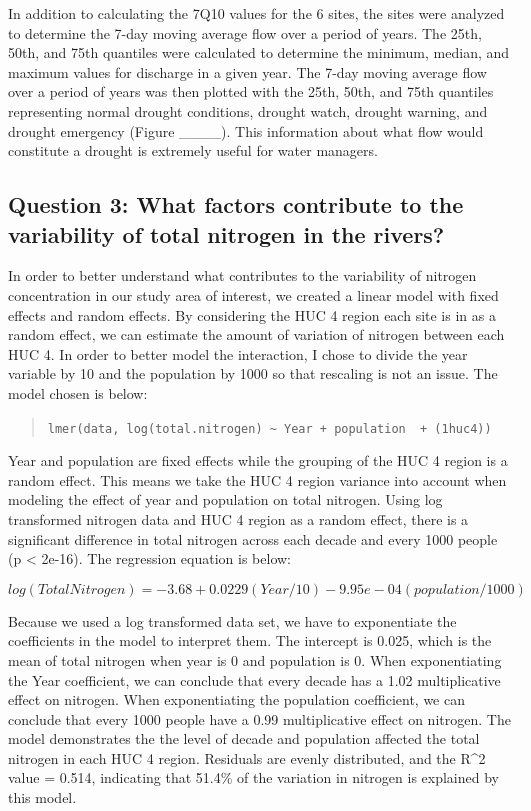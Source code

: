 \documentclass[12pt,]{article}
\begin{document}
In addition to calculating the 7Q10 values for the 6 sites, the sites
were analyzed to determine the 7-day moving average flow over a period
of years. The 25th, 50th, and 75th quantiles were calculated to
determine the minimum, median, and maximum values for discharge in a
given year. The 7-day moving average flow over a period of years was
then plotted with the 25th, 50th, and 75th quantiles representing normal
drought conditions, drought watch, drought warning, and drought
emergency (Figure \_\_\_\_). This information about what flow would
constitute a drought is extremely useful for water managers.

\hypertarget{question-3-what-factors-contribute-to-the-variability-of-total-nitrogen-in-the-rivers}{%
\subsection{Question 3: What factors contribute to the variability of
total nitrogen in the
rivers?}\label{question-3-what-factors-contribute-to-the-variability-of-total-nitrogen-in-the-rivers}}

In order to better understand what contributes to the variability of
nitrogen concentration in our study area of interest, we created a
linear model with fixed effects and random effects. By considering the
HUC 4 region each site is in as a random effect, we can estimate the
amount of variation of nitrogen between each HUC 4. In order to better
model the interaction, I chose to divide the year variable by 10 and the
population by 1000 so that rescaling is not an issue. The model chosen
is below:

\begin{quote}
\texttt{lmer(data,\ log(total.nitrogen)\ \textasciitilde{}\ Year\ +\ population\ \ +\ (1\textbar{}huc4))}
\end{quote}

Year and population are fixed effects while the grouping of the HUC 4
region is a random effect. This means we take the HUC 4 region variance
into account when modeling the effect of year and population on total
nitrogen. Using log transformed nitrogen data and HUC 4 region as a
random effect, there is a significant difference in total nitrogen
across each decade and every 1000 people (p \textless{} 2e-16). The
regression equation is below:

\[log(Total Nitrogen) = -3.68 + 0.0229(Year/10) - 9.95e-04(population/1000)\]

Because we used a log transformed data set, we have to exponentiate the
coefficients in the model to interpret them. The intercept is 0.025,
which is the mean of total nitrogen when year is 0 and population is 0.
When exponentiating the Year coefficient, we can conclude that every
decade has a 1.02 multiplicative effect on nitrogen. When exponentiating
the population coefficient, we can conclude that every 1000 people have
a 0.99 multiplicative effect on nitrogen. The model demonstrates the the
level of decade and population affected the total nitrogen in each HUC 4
region. Residuals are evenly distributed, and the R\^{}2 value = 0.514,
indicating that 51.4\% of the variation in nitrogen is explained by this
model.
\end{document}
